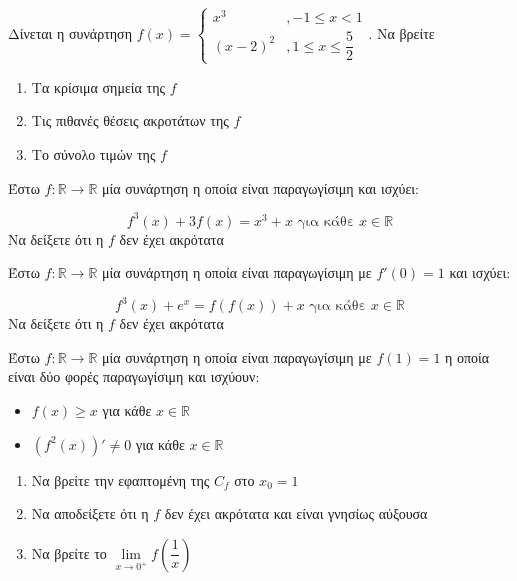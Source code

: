 \documentclass{presentation}
\begin{document}
\begin{askisi}
  Δίνεται η συνάρτηση $f(x)=\begin{cases}
      x^3     & ,-1\le x<1               \\
      (x-2)^2 & , 1\le x\le \dfrac{5}{2}
    \end{cases}$.
  Να βρείτε
  \begin{enumerate}
    \item<1-> Τα κρίσιμα σημεία της $f$
    \item<2-> Τις πιθανές θέσεις ακροτάτων της $f$
    \item<3-> Το σύνολο τιμών της $f$
  \end{enumerate}

\end{askisi}

\begin{askisi}
  Έστω $f:\mathbb{R}\to\mathbb{R}$ μία συνάρτηση η οποία είναι παραγωγίσιμη και ισχύει:

  $$f^3(x)+3f(x)=x^3+x \text{ για κάθε } x\in\mathbb{R}$$
  Να δείξετε ότι η $f$ δεν έχει ακρότατα

\end{askisi}

\begin{askisi}
  Έστω $f:\mathbb{R}\to\mathbb{R}$ μία συνάρτηση η οποία είναι παραγωγίσιμη με $f'(0)=1$ και ισχύει:

  $$f^3(x)+e^x=f(f(x))+x \text{ για κάθε } x\in\mathbb{R}$$
  Να δείξετε ότι η $f$ δεν έχει ακρότατα

\end{askisi}

\begin{askisi}
  Έστω $f:\mathbb{R}\to\mathbb{R}$ μία συνάρτηση η οποία είναι παραγωγίσιμη με $f(1)=1$ η οποία είναι δύο φορές παραγωγίσιμη και ισχύουν:
  \begin{itemize}
    \item $f(x)\ge x$ για κάθε $x\in\mathbb{R}$
    \item $\left( f^2(x) \right)'\ne 0$ για κάθε $x\in\mathbb{R}$
  \end{itemize}

  \begin{enumerate}
    \item<1-> Να βρείτε την εφαπτομένη της $C_f$ στο $x_0=1$
    \item<2-> Να αποδείξετε ότι η $f$ δεν έχει ακρότατα και είναι γνησίως αύξουσα
    \item<3-> Να βρείτε το $\lim\limits_{x \to 0^+}{ f\left( \dfrac{1}{x} \right) }$
  \end{enumerate}

\end{askisi}
\end{document}
